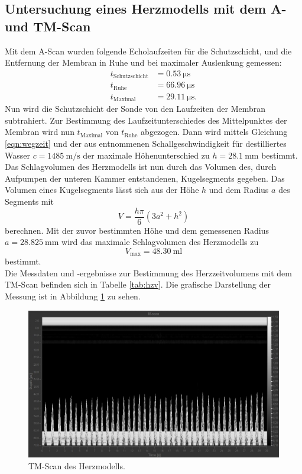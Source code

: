 \subsection{Untersuchung eines Herzmodells mit dem A- und TM-Scan}
Mit dem A-Scan wurden folgende Echolaufzeiten für die Schutzschicht, und die Entfernung der Membran in Ruhe und bei maximaler Auslenkung gemessen:
\begin{align*}
  t_\text{Schutzschicht} &= \SI{0.53}{\micro\second} \\
  t_\text{Ruhe} &= \SI{66.96}{\micro\second} \\
  t_\text{Maximal} &= \SI{29.11}{\micro\second} .
\end{align*}
Nun wird die Schutzschicht der Sonde von den Laufzeiten der Membran subtrahiert. Zur Bestimmung des Laufzeitunterschiedes des Mittelpunktes der Membran wird
nun $t_\text{Maximal}$ von $t_\text{Ruhe}$ abgezogen. Dann wird mittels Gleichung \eqref{eqn:wegzeit} und der aus \cite{wasser} entnommenen Schallgeschwindigkeit
für destilliertes Wasser $c=\SI{1485}{\metre\per\second}$ der maximale Höhenunterschied zu $h=\SI{28.1}{\milli\metre}$ bestimmt.
Das Schlagvolumen des Herzmodells ist nun durch das Volumen des, durch Aufpumpen der unteren Kammer entstandenen, Kugelsegments gegeben.
Das Volumen eines Kugelsegments lässt sich aus der Höhe $h$ und dem Radius $a$ des Segments mit
\begin{equation}
  V = \frac{h \pi}{6} (3a^2+h^2)
  \label{eqn:herzvol}
\end{equation}
berechnen. Mit der zuvor bestimmten Höhe und dem gemessenen Radius $a=\SI{28.825}{\milli\metre}$ wird das maximale Schlagvolumen des Herzmodells zu
\begin{equation*}
  V_\text{max}= \SI{48.30}{\milli\litre}
\end{equation*}
bestimmt.
\\
Die Messdaten und -ergebnisse zur Bestimmung des Herzzeitvolumens mit dem TM-Scan befinden sich in Tabelle \ref{tab:hzv}. Die grafische Darstellung der Messung ist in Abbildung
\ref{fig:hzv} zu sehen.
\begin{figure}
  \centering
  \includegraphics[scale=0.4]{images/herzreal.jpg}
  \caption{TM-Scan des Herzmodells.}
  \label{fig:hzv}
\end{figure}
